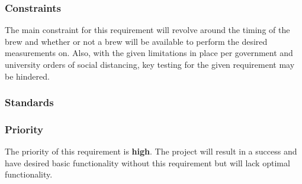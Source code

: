 \subsubsection{Constraints}
The main constraint for this requirement will revolve around the timing of the brew and whether or not a brew will be available to perform the desired measurements on. Also, with the given limitations in place per government and university orders of social distancing, key testing for the given requirement may be hindered.
\subsubsection{Standards}
\subsubsection{Priority}
The priority of this requirement is \textbf{high}. The project will result in a success and have desired basic functionality without this requirement but will lack optimal functionality.
